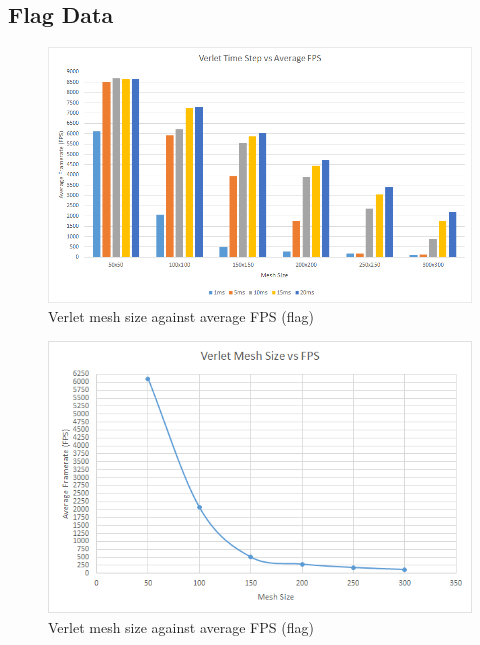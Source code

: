 \begin{landscape}
\subsection{Flag Data}

    \begin{figure}[!htb]
    \begin{center}
      \includegraphics[scale=0.95]{Figures/flag_v_fps}
    \end{center}
    \caption{Verlet mesh size against average FPS (flag)}
    \label{fig:v fps flag}
  \end{figure}
\end{landscape}
  
    \begin{figure}
    \begin{center}
      \includegraphics[scale=.9]{Figures/flag_v_m_fps}
    \end{center}
    \caption{Verlet mesh size against average FPS (flag)}
    \label{fig:v mesh fps flag}
  \end{figure}
  
